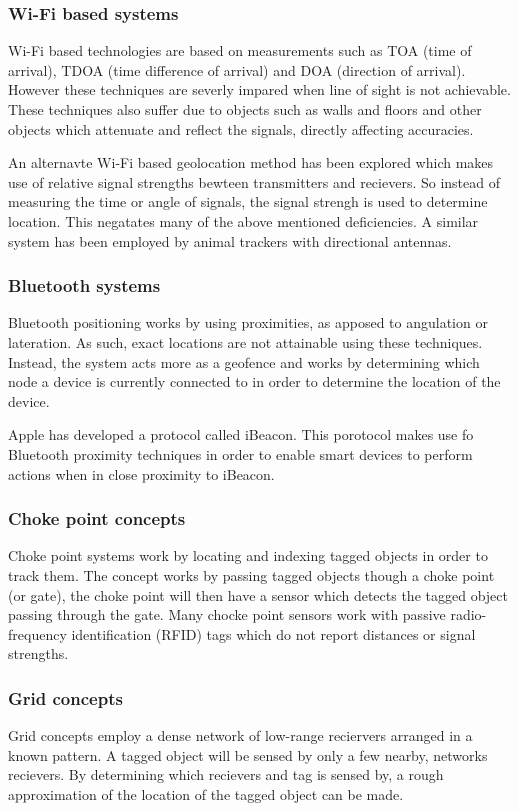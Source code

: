 \documentclass[11pt,a4paper]{article}
\begin{document}
	\subsubsection{Wi-Fi based systems}
		Wi-Fi based technologies are based on measurements such as TOA (time of arrival), TDOA (time difference of arrival) and DOA (direction of arrival). However these techniques are severly impared when line of sight is not achievable. These techniques also suffer due to objects such as walls and floors and other objects which attenuate and reflect the signals, directly affecting accuracies.
	
		An alternavte Wi-Fi based geolocation method has been explored which makes use of relative signal strengths bewteen transmitters and recievers. So instead of measuring the time or angle of signals, the signal strengh is used to determine location. This negatates many of the above mentioned deficiencies. A similar system has been employed by animal trackers with directional antennas.
		\cite{yongguang_chen_signal_2002}
	
	\subsubsection{Bluetooth systems}
		Bluetooth positioning works by using proximities, as apposed to angulation or lateration. As such, exact locations are not attainable using these techniques. Instead, the system acts more as a geofence and works by determining which node a device is currently connected to in order to determine the location of the device.
	
		Apple has developed a protocol called iBeacon. This porotocol makes use fo Bluetooth proximity techniques in order to enable smart devices to perform actions when in close proximity to iBeacon.
		\cite{_everything_????}
	
	\subsubsection{Choke point concepts}
		Choke point systems work by locating and indexing tagged objects in order to track them. The concept works by passing tagged objects though a choke point (or gate), the choke point will then have a sensor which detects the tagged object passing through the gate. Many chocke point sensors work with passive radio-frequency identification (RFID) tags which do not report distances or signal strengths.
		\cite{reza_investigation_2008}
	
	\subsubsection{Grid concepts}
		Grid concepts employ a dense network of low-range reciervers arranged in a known pattern. A tagged object will be sensed by only a few nearby, networks recievers. By determining which recievers and tag is sensed by, a rough approximation of the location of the tagged object can be made.
	
\end{document}
